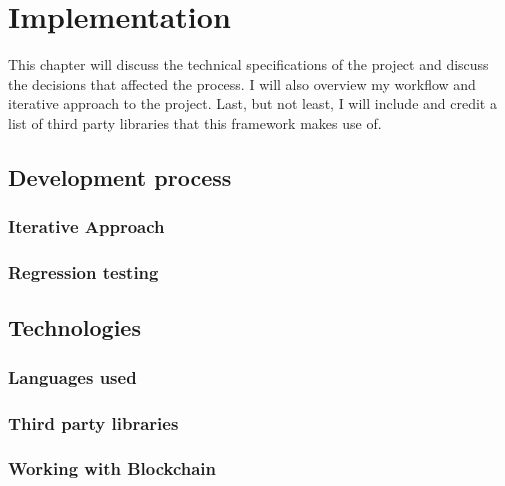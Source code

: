 \chapter{Implementation\label{chap:implementation}}
This chapter will discuss the technical specifications of the project and discuss the decisions that affected the process. I will also overview my workflow and iterative approach to the project. Last, but not least, I will include and credit a list of third party libraries that this framework makes use of.

\section{Development process}

\subsection{Iterative Approach}

\subsection{Regression testing}

\section{Technologies}

\subsection{Languages used}

\subsection{Third party libraries}

\subsection{Working with Blockchain}

